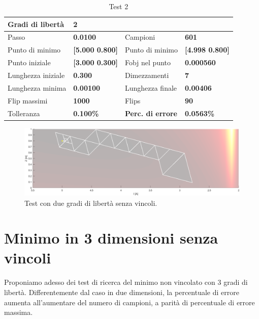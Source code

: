 \documentclass[a4paper, 11pt]{article}
\begin{document}
\begin{table}[h]
    \caption{Test 2}
    \begin{center}
    \begin{tabular}{|l|l|l|l|} 
    \hline 
Gradi di libertà & \textbf{2} &  &  \\ \hline 
Passo & \textbf{0.0100} & Campioni & \textbf{601} \\ \hline 
Punto di minimo & \textbf{{[}5.000 0.800{]}} & Punto di minimo &
\textbf{{[}4.998 0.800{]}} \\ \hline 
Punto iniziale & \textbf{{[}3.000 0.300{]}} & Fobj nel punto & \textbf{0.000560}
\\ \hline 
Lunghezza iniziale & \textbf{0.300} & Dimezzamenti & \textbf{7} \\ \hline 
Lunghezza minima & \textbf{0.00100} & Lunghezza finale & \textbf{0.00406} \\
\hline
Flip massimi & \textbf{1000} & Flips & \textbf{90} \\ \hline 
Tolleranza & \textbf{0.100\%} & \textbf{Perc. di errore} & \textbf{0.0563\%} \\
\hline 
    \end{tabular} 
    \end{center}
    \end{table}

\begin{figure}[H]
    \centering
        \includegraphics[width=15cm]{assets/figure10}
        \caption{Test con due gradi di libertà senza vincoli.}
\end{figure}

\section{Minimo in 3 dimensioni senza vincoli}

Proponiamo adesso dei test di ricerca del minimo non vincolato con 3 gradi di
libertà. Differentemente dal caso in due dimensioni, la percentuale di errore
aumenta all'aumentare del numero di campioni, a parità di percentuale di errore
massima.
\end{document}
